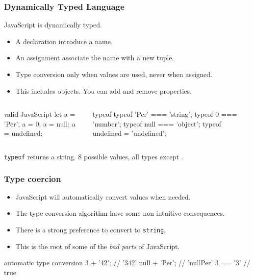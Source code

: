 \begin{frame}[fragile]
  \frametitle{Dynamically Typed Language}
  JavaScript is dynamically typed.\\
  \begin{itemize}
    \item A declaration introduce a name.
    \item An assignment associate the name with a new  tuple.
    \item Type conversion only when values are used, never when assigned.
    \item This includes objects. You can add and remove properties.
  \end{itemize}
  \vspace{5mm}
  \begin{columns}[onlytextwidth]
    \begin{column}{0.4\textwidth}
      \begin{CodeBox}{ valid JavaScript}
let a = 'Per';  
a = 0;
a = null;
a = undefined;
      \end{CodeBox}
    \end{column}
  \begin{column}{0.55\textwidth}
    \begin{CodeBox}{typeof}
typeof 'Per' === 'string';
typeof 0 === 'number';
typeof null === 'object';
typeof undefined = 'undefined';
      \end{CodeBox}
    \end{column}
    \begin{column}{0.3\textwidth}  \end{column}
  \end{columns}%
  \vspace{5mm}
\verb|typeof| returns a string. 8 possible values, all types except .
\end{frame}

\begin{frame}[fragile]
  \frametitle{Type coercion}
  \begin{itemize}
    \item JavaScript will automatically convert values when needed.
    \item The type conversion algorithm have some non intuitive consequences.
    \item There is a strong preference to convert to \verb|string|.
    \item This is the root of some of the \emph{bad parts} of JavaScript.
 \end{itemize}
\vspace{5mm}
  \begin{CodeBox}{ automatic type conversion}
3 + '42';      // '342'
null + 'Per'; //  'nullPer'
3 == '3'       // true
  \end{CodeBox}
\end{frame}

